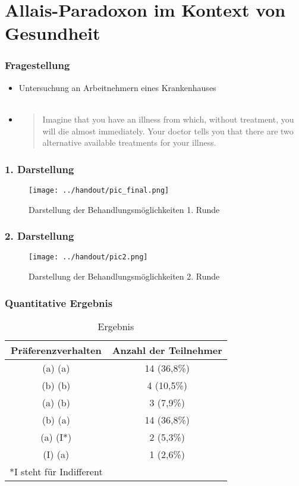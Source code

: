 \documentclass{beamer}
\begin{document}
\section{Allais-Paradoxon im Kontext von Gesundheit}

\begin{frame}
  \frametitle{Fragestellung }
  \begin{itemize}
  \item<1> Untersuchung an Arbeitnehmern eines Krankenhauses\\~\\
  \item<2->
    \begin{quote}
       Imagine that you have an illness from which, without treatment, you will die almost immediately. Your doctor tells you that there are two alternative available treatments for your illness. 
     \end{quote}
  \end{itemize}
\end{frame}

\begin{frame}
  \frametitle{1. Darstellung}
  \begin{figure}[!h]
        \texttt{[image: ../handout/pic\_final.png]}
  \caption{Darstellung der Behandlungsm\"oglichkeiten 1. Runde}\label{fig:graph}
\end{figure}
\end{frame}

\begin{frame}
  \frametitle{2. Darstellung}
\begin{figure}[!h]
  \centering
  \texttt{[image: ../handout/pic2.png]}
    \caption{Darstellung der Behandlungsm\"oglichkeiten 2. Runde}
  \label{fig:graph2}
\end{figure} 
\end{frame}

\begin{frame}
  \frametitle{Quantitative Ergebnis}
  \begin{table}[!h]
  \centering
  \begin{tabular}{c c}
    \toprule
   \textbf{Präferenzverhalten}  & \textbf{Anzahl der Teilnehmer}\\ \midrule
    (a) (a) & 14 (36,8\%) \\ \midrule 
    (b) (b) & 4 (10,5\%) \\ \midrule
    (a) (b) & 3 (7,9\%) \\ \midrule
    (b) (a) & 14 (36,8\%) \\ \midrule
    (a) (I*) & 2 (5,3\%) \\ \midrule
    (I) (a) & 1 (2,6\%) \\ \bottomrule
    \tiny{*I steht f\"ur Indifferent}& \\\hline
  \end{tabular}
  \caption{Ergebnis}
  \label{tab:erg}
\end{table}
\end{frame}
\end{document}
